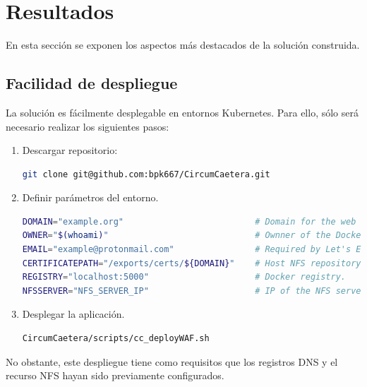 \chapter {Resultados}
\par En esta sección se exponen los aspectos más destacados de la solución construida.

\section{Facilidad de despliegue}
\par La solución es fácilmente desplegable en entornos Kubernetes. Para ello, sólo será necesario realizar los siguientes pasos:
\begin{enumerate}
  \item Descargar repositorio: \\
		\begin{minipage}{\linewidth}
		\begin{lstlisting}[language=bash]
git clone git@github.com:bpk667/CircumCaetera.git
		\end{lstlisting}
		\end{minipage}
  \item Definir parámetros del entorno. \\
		\begin{minipage}{\linewidth}
		\begin{lstlisting}[language=bash]
DOMAIN="example.org"                          # Domain for the web services.
OWNER="$(whoami)"                             # Ownner of the Docker registry.
EMAIL="example@protonmail.com"                # Required by Let's Encrypt.
CERTIFICATEPATH="/exports/certs/${DOMAIN}"    # Host NFS repository for sharing certificates.
REGISTRY="localhost:5000"                     # Docker registry.
NFSSERVER="NFS_SERVER_IP"                     # IP of the NFS server
		\end{lstlisting}
		\end{minipage}
  \item Desplegar la aplicación. \\
		\begin{minipage}{\linewidth}
		\begin{lstlisting}[language=bash]
CircumCaetera/scripts/cc_deployWAF.sh
		\end{lstlisting}
		\end{minipage}
\end{enumerate}

No obstante, este despliegue tiene como requisitos que los registros DNS y el recurso NFS hayan sido previamente configurados.

